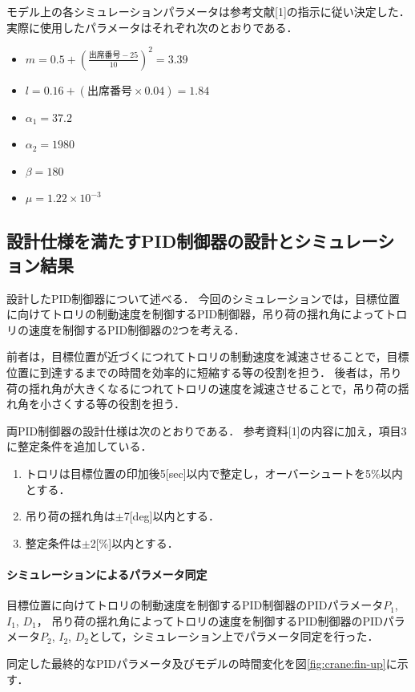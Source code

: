 \documentclass[dvipdfmx,titlepage,a4j]{jsarticle}  %
\begin{document}
モデル上の各シミュレーションパラメータは参考文献[1]の指示に従い決定した．
実際に使用したパラメータはそれぞれ次のとおりである．
\begin{itemize}
  \item $m = 0.5 + (\frac{出席番号 - 25}{10})^2 = 3.39$
  \item $l = 0.16 + (出席番号 \times 0.04) = 1.84$
  \item $\alpha_1 = 37.2$
  \item $\alpha_2 = 1980$
  \item $\beta = 180$
  \item $\mu = 1.22 \times  10^{-3}$
\end{itemize}

\subsection{設計仕様を満たすPID制御器の設計とシミュレーション結果}
設計したPID制御器について述べる．
今回のシミュレーションでは，目標位置に向けてトロリの制動速度を制御するPID制御器，吊り荷の揺れ角によってトロリの速度を制御するPID制御器の2つを考える．

前者は，目標位置が近づくにつれてトロリの制動速度を減速させることで，目標位置に到達するまでの時間を効率的に短縮する等の役割を担う．
後者は，吊り荷の揺れ角が大きくなるにつれてトロリの速度を減速させることで，吊り荷の揺れ角を小さくする等の役割を担う．

両PID制御器の設計仕様は次のとおりである．
参考資料[1]の内容に加え，項目3に整定条件を追加している．

\begin{enumerate}
  \item トロリは目標位置の印加後5[sec]以内で整定し，オーバーシュートを5\%以内とする．
  \item 吊り荷の揺れ角は$\pm$7[deg]以内とする．
  \item 整定条件は$\pm$2[\%]以内とする．
\end{enumerate}

\paragraph{シミュレーションによるパラメータ同定}

目標位置に向けてトロリの制動速度を制御するPID制御器のPIDパラメータ$P_1$, $I_1$, $D_1$，
吊り荷の揺れ角によってトロリの速度を制御するPID制御器のPIDパラメータ$P_2$, $I_2$, $D_2$として，シミュレーション上でパラメータ同定を行った．

同定した最終的なPIDパラメータ及びモデルの時間変化を図\ref{fig:crane:fin-up}に示す．
\end{document}
